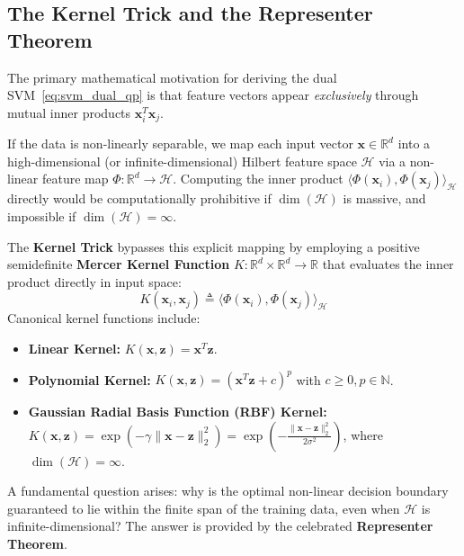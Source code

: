 \subsection{The Kernel Trick and the Representer Theorem}
The primary mathematical motivation for deriving the dual SVM~\eqref{eq:svm_dual_qp} is that feature vectors appear \emph{exclusively} through mutual inner products $\mathbf{x}_i^T \mathbf{x}_j$. 

If the data is non-linearly separable, we map each input vector $\mathbf{x} \in \mathbb{R}^d$ into a high-dimensional (or infinite-dimensional) Hilbert feature space $\mathcal{H}$ via a non-linear feature map $\Phi: \mathbb{R}^d \to \mathcal{H}$. Computing the inner product $\langle \Phi(\mathbf{x}_i), \Phi(\mathbf{x}_j) \rangle_{\mathcal{H}}$ directly would be computationally prohibitive if $\dim(\mathcal{H})$ is massive, and impossible if $\dim(\mathcal{H}) = \infty$.

The \textbf{Kernel Trick} bypasses this explicit mapping by employing a positive semidefinite \textbf{Mercer Kernel Function} $K: \mathbb{R}^d \times \mathbb{R}^d \to \mathbb{R}$ that evaluates the inner product directly in input space:
\begin{equation}
K(\mathbf{x}_i, \mathbf{x}_j) \triangleq \langle \Phi(\mathbf{x}_i), \Phi(\mathbf{x}_j) \rangle_{\mathcal{H}}
\end{equation}
Canonical kernel functions include:
\begin{itemize}
    \item \textbf{Linear Kernel:} $K(\mathbf{x}, \mathbf{z}) = \mathbf{x}^T \mathbf{z}$.
    \item \textbf{Polynomial Kernel:} $K(\mathbf{x}, \mathbf{z}) = (\mathbf{x}^T \mathbf{z} + c)^p$ with $c \ge 0, p \in \mathbb{N}$.
    \item \textbf{Gaussian Radial Basis Function (RBF) Kernel:} $K(\mathbf{x}, \mathbf{z}) = \exp\left( -\gamma \|\mathbf{x} - \mathbf{z}\|_2^2 \right) = \exp\left( -\frac{\|\mathbf{x} - \mathbf{z}\|_2^2}{2\sigma^2} \right)$, where $\dim(\mathcal{H}) = \infty$.
\end{itemize}

A fundamental question arises: why is the optimal non-linear decision boundary guaranteed to lie within the finite span of the training data, even when $\mathcal{H}$ is infinite-dimensional? The answer is provided by the celebrated \textbf{Representer Theorem}.

